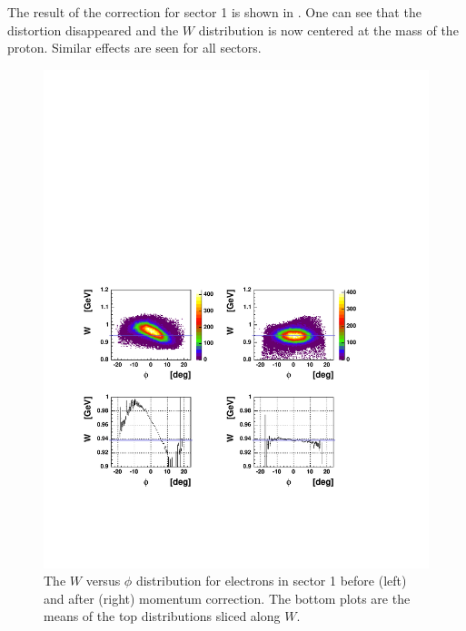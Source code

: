 The result of the correction for sector 1 is shown  in . One can see that the 
distortion disappeared and the $W$ distribution is now centered at the mass of the proton.
Similar effects are seen for all sectors.
\begin{figure}[h]
 \includegraphics[width = 14.4cm, bb=40 100 500 500]{data_reduction/kine_corr/img/corr_e_result} 
  \caption[The $W$ versus $\phi$ distribution for electrons in sector 1 before (left) and after (right) momentum correction]
          { The $W$ versus $\phi$ distribution for electrons in sector 1  
                     before (left) and after (right)  momentum correction. 
		     The bottom plots are the means of the top distributions sliced along $W$.}
 \label{fig:corr_e_result}
\end{figure}






